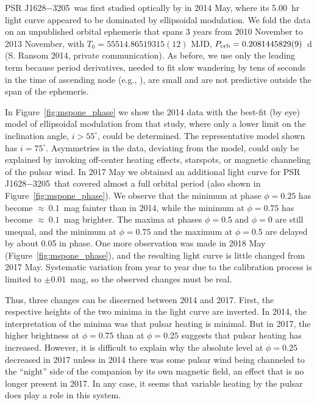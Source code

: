\documentclass[iop]{emulateapj}
\newcommand{\mspone}{PSR J1628$-$3205}
\begin{document}
\mspone\ was first studied optically by \citet{li14} in 2014 May, where its
5.00~hr light curve appeared to be dominated by ellipsoidal modulation.
We fold the data on an unpublished orbital ephemeris that spans 3
years from 2010 November to 2013 November, with $T_0 = 55514.86519315(12)$ MJD,
$P_{\rm orb}=0.2081445829(9)$~d (S. Ransom 2014, private communication).
As before, we use only the leading term because
period derivatives, needed to fit slow wandering by tens of seconds
in the time of ascending node (e.g., \citealt{den16}), are small and
are not predictive outside the span of the ephemeris.

In Figure~\ref{fig:mspone_phase} we show the 2014 data with the best-fit
(by eye) model of ellipsoidal modulation from that study,
where only a lower limit on the inclination angle, $i>55^{\circ}$,
could be determined.  The representative model shown has $i=75^{\circ}$. 
Asymmetries in the data, deviating from the model, could only be explained
by invoking off-center heating effects, starspots, or magnetic
channeling of the pulsar wind.  In 2017 May we obtained an additional 
light curve for \mspone\ that covered almost a full orbital period
(also shown in Figure~\ref{fig:mspone_phase}).
We observe that the minimum at phase $\phi=0.25$ has become
$\approx~0.1$~mag fainter than in 2014, while the minimum at
$\phi=0.75$ has become $\approx~0.1$~mag brighter.
The maxima at phases $\phi=0.5$ and $\phi=0$ are still unequal,
and the minimum at $\phi=0.75$ and the maximum at
$\phi=0.5$ are delayed by about 0.05 in phase.  One more
observation was made in 2018 May (Figure~\ref{fig:mspone_phase}),
and the resulting light curve is little changed from 2017 May.
Systematic variation from year to year due to the calibration
process is limited to $\pm0.01$~mag, so the observed changes
must be real.

Thus, three changes can be discerned between 2014 and 2017.
First, the respective heights of the two minima in the light curve
are inverted.  In 2014, the interpretation of the minima was that 
pulsar heating is minimal.  But in 2017, the higher brightness at $\phi=0.75$
than at  $\phi=0.25$ suggests that pulsar heating has increased.
However, it is difficult to explain why the absolute level at $\phi=0.25$
decreased in 2017 unless in 2014 there was some pulsar wind being channeled
to the ``night'' side of the companion by its own magnetic field, an effect
that is no longer present in 2017.  In any case, it seems that variable
heating by the pulsar does play a role in this system.
\end{document}

